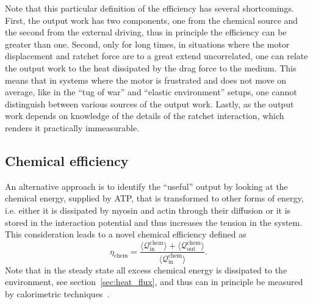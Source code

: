 \documentclass[aps,pre,twocolumn,showpacs,showkeys,superscriptaddress,floatfix]{revtex4-1}
\begin{document}
Note that this particular definition of the efficiency has several shortcomings.
First, the output work has two components, one from the chemical source and the second from the external driving, 
thus in principle the efficiency can be greater than one. 
Second, 
only for long times, in situations where the motor displacement and ratchet force are to a great extend uncorrelated, 
one can relate the output work to the heat dissipated by the drag force to the medium.
This means that in systems where the motor is frustrated and does not move on average, 
like in the ``tug of war'' and ``elastic environment'' setups,
one cannot distinguish between various sources of the output work. 
Lastly, as the output work depends on knowledge of the details of the ratchet interaction, which renders it practically immeasurable.


\subsection{Chemical efficiency} 
\label{sec:chemical_efficiency}
An alternative approach is to identify the ``useful'' output by looking at the chemical energy, supplied by ATP, that is transformed to other forms of energy, 
i.e. either it is dissipated by myosin and actin through their diffusion or it is stored in the interaction potential and thus increases the tension in the system. 
This consideration leads to a novel chemical efficiency defined as 
\begin{equation}
\eta_\text{chem} = \frac{\langle\mathcal Q^\text{chem}_\text{in}\rangle+\langle\mathcal Q^\text{chem}_\text{out}\rangle}{\langle\mathcal Q^\text{chem}_\text{in}\rangle} .
\label{eq:efficiency}
\end{equation}
Note that in the steady state all excess chemical energy is dissipated to the environment, see section~\ref{sec:heat_flux}, 
and thus can in principle be measured by calorimetric techniques~\cite{}. %
\end{document}
